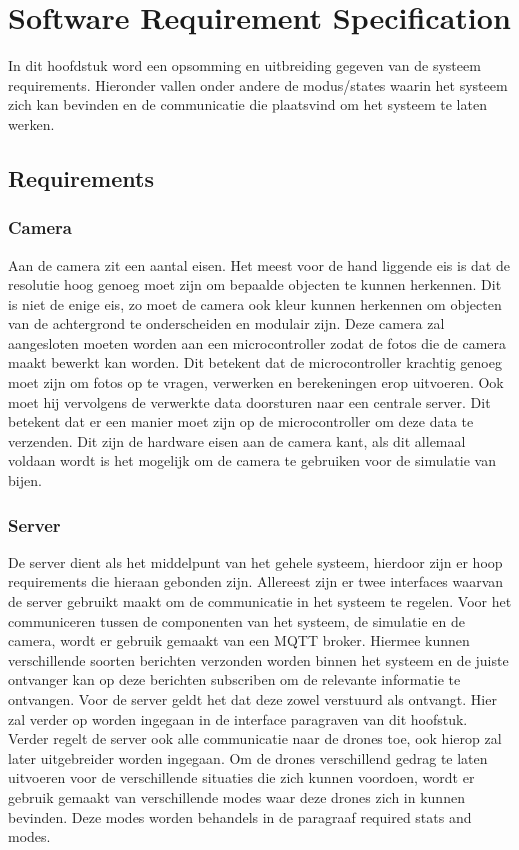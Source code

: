 \section{Software Requirement Specification}
In dit hoofdstuk word een opsomming en uitbreiding gegeven van de systeem requirements. Hieronder vallen onder andere
de modus/states waarin het systeem zich kan bevinden en de communicatie die plaatsvind om het systeem te laten werken.

\subsection{Requirements}

\subsubsection*{Camera}
Aan de camera zit een aantal eisen. Het meest voor de hand liggende eis is dat de resolutie hoog genoeg moet zijn
om bepaalde objecten te kunnen herkennen. Dit is niet de enige eis, zo moet de camera ook kleur kunnen herkennen 
om objecten van de achtergrond te onderscheiden en modulair zijn. Deze camera zal aangesloten moeten worden aan 
een microcontroller zodat de fotos die de camera maakt bewerkt kan worden. Dit betekent dat de microcontroller 
krachtig genoeg moet zijn om fotos op te vragen, verwerken en berekeningen erop uitvoeren. Ook moet hij vervolgens 
de verwerkte data doorsturen naar een centrale server. Dit betekent dat er een manier moet zijn op de microcontroller 
om deze data te verzenden. Dit zijn de hardware eisen aan de camera kant, 
als dit allemaal voldaan wordt is het mogelijk om de camera te gebruiken voor de simulatie van bijen.

\subsubsection*{Server}
De server dient als het middelpunt van het gehele systeem, hierdoor zijn er hoop requirements die hieraan gebonden zijn.
Allereest zijn er twee interfaces waarvan de server gebruikt maakt om de communicatie in het systeem te regelen.
Voor het communiceren tussen de componenten van het systeem, de simulatie en de camera, wordt er gebruik gemaakt van een
MQTT broker. Hiermee kunnen verschillende soorten berichten verzonden worden binnen het systeem en de juiste ontvanger kan
op deze berichten subscriben om de relevante informatie te ontvangen. Voor de server geldt het dat deze zowel verstuurd als ontvangt.
Hier zal verder op worden ingegaan in de interface paragraven van dit hoofstuk. Verder regelt de server ook alle communicatie 
naar de drones toe, ook hierop zal later uitgebreider worden ingegaan. Om de drones verschillend gedrag te laten uitvoeren 
voor de verschillende situaties die zich kunnen voordoen, wordt er gebruik gemaakt van verschillende modes waar deze drones zich in kunnen bevinden. 
Deze modes worden behandels in de paragraaf required stats and modes.


